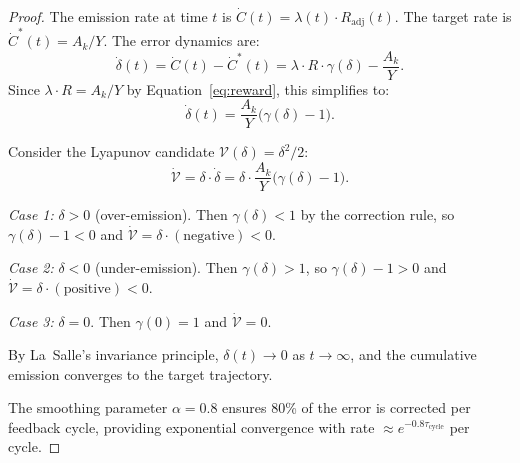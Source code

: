 \documentclass[11pt,a4paper]{article}
\theoremstyle{definition}
\theoremstyle{remark}
\newcommand{\reward}{R}
\newcommand{\blockrate}{\lambda}
\newcommand{\Lyap}{\mathcal{V}}
\begin{document}
\begin{proof}
The emission rate at time $t$ is
$\dot{C}(t) = \blockrate(t) \cdot \reward_{\text{adj}}(t)$.
The target rate is $\dot{C}^*(t) = A_k / Y$.
The error dynamics are:
\[
  \dot{\delta}(t) = \dot{C}(t) - \dot{C}^*(t) =
  \blockrate \cdot \reward \cdot \gamma(\delta) - \frac{A_k}{Y}.
\]
Since $\blockrate \cdot \reward = A_k / Y$ by
Equation~\eqref{eq:reward}, this simplifies to:
\[
  \dot{\delta}(t) = \frac{A_k}{Y} \bigl(\gamma(\delta) - 1\bigr).
\]

Consider the Lyapunov candidate $\Lyap(\delta) = \delta^2 / 2$:
\[
  \dot{\Lyap} = \delta \cdot \dot{\delta} =
  \delta \cdot \frac{A_k}{Y} \bigl(\gamma(\delta) - 1\bigr).
\]

\emph{Case 1:} $\delta > 0$ (over-emission).
Then $\gamma(\delta) < 1$ by the correction rule, so
$\gamma(\delta) - 1 < 0$ and $\dot{\Lyap} = \delta \cdot (\text{negative}) < 0$.

\emph{Case 2:} $\delta < 0$ (under-emission).
Then $\gamma(\delta) > 1$, so
$\gamma(\delta) - 1 > 0$ and $\dot{\Lyap} = \delta \cdot (\text{positive}) < 0$.

\emph{Case 3:} $\delta = 0$.
Then $\gamma(0) = 1$ and $\dot{\Lyap} = 0$.

By La~Salle's invariance principle, $\delta(t) \to 0$ as $t \to \infty$,
and the cumulative emission converges to the target trajectory.

The smoothing parameter $\alpha = 0.8$ ensures 80\% of the error is
corrected per feedback cycle, providing exponential convergence with
rate $\approx e^{-0.8\tau_{\text{cycle}}}$ per cycle.
\end{proof}
\end{document}
